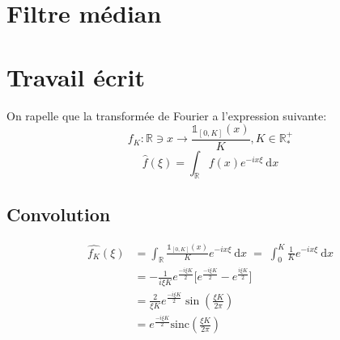 \documentclass{article}
\begin{document}
\section{Filtre médian}

\section{Travail écrit}
On rapelle que la transformée de Fourier a l'expression suivante:
$$ f_K : \mathbb{R} \ni x \rightarrow \frac{\mathds{1}_{[0, K]}(x)}{K}, K \in \mathbb{R}_*^+ $$
$$ \hat{f}(\xi) = \int_\mathbb{R} f(x) e^{-ix\xi} \:\mathrm{d}x$$

\subsection{Convolution}

\begin{equation*}\begin{split}
\hat{f_K}(\xi) 
&= \int_\mathbb{R} \frac{\mathds{1}_{[0, K]}(x)}{K} e^{-ix\xi} \:\mathrm{d}x \;=\; \int_0^{K} \frac{1}{K}e^{-ix\xi}\:\mathrm{d} x \\
&= -\frac{1}{i \xi K} e^{\frac{-i \xi K}{2}}\bigg [ e^{\frac{-i \xi K}{2}} - e^{\frac{i \xi K}{2}} \bigg] \\
&= \frac{2}{\xi K} e^{\frac{-i \xi K}{2}} \sin(\frac{\xi K}{2\pi})\\
&= e^{\frac{-i \xi K}{2}} \text{sinc}(\frac{\xi K}{2\pi})
\end{split}\end{equation*}
\end{document}
